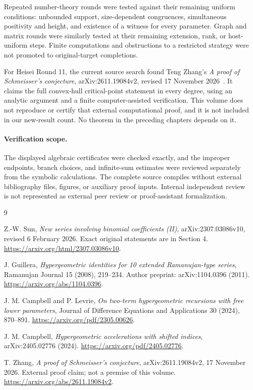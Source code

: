 \documentclass[11pt,a4paper]{article}
\theoremstyle{remark}\newtheorem{remark}[theorem]{Remark}
\numberwithin{equation}{section}
\begin{document}
Repeated number-theory rounds were tested against their remaining uniform
conditions: unbounded support, size-dependent congruences, simultaneous
positivity and height, and existence of a witness for every parameter.
Graph and matrix rounds were similarly tested at their remaining extension,
rank, or host-uniform steps. Finite computations and obstructions to a
restricted strategy were not promoted to original-target completions.

For Heisei Round 11, the current source search found Teng Zhang's
\emph{A proof of Schmeisser's conjecture}, arXiv:2611.19084v2, revised
17 November 2026~\cite{Zhang}. It claims the full convex-hull critical-point
statement in every degree, using an analytic argument and a finite
computer-assisted verification. This volume does not reproduce or certify
that external computational proof, and it is not included in our new-result
count. No theorem in the preceding chapters depends on it.

\paragraph{Verification scope.}
The displayed algebraic certificates were checked exactly, and the
improper endpoints, branch choices, and infinite-sum estimates were reviewed
separately from the symbolic calculations. The complete source compiles
without external bibliography files, figures, or auxiliary proof inputs.
Internal independent review is not represented as external peer review or
proof-assistant formalization.

\begin{thebibliography}{9}\raggedright
{}
Z.-W. Sun, \emph{New series involving binomial coefficients (II)},
arXiv:2307.03086v10, revised 6 February 2026.
Exact original statements are in Section 4.
\url{https://arxiv.org/html/2307.03086v10}.

J. Guillera, \emph{Hypergeometric identities for 10 extended
Ramanujan-type series}, Ramanujan Journal 15 (2008), 219--234.
Author preprint: arXiv:1104.0396 (2011).
\url{https://arxiv.org/abs/1104.0396}.

J. M. Campbell and P. Levrie,
\emph{On two-term hypergeometric recursions with free lower parameters},
Journal of Difference Equations and Applications 30 (2024), 870--891.
\url{https://arxiv.org/pdf/2305.00626}.

J. M. Campbell, \emph{Hypergeometric accelerations with shifted indices},
arXiv:2405.02776 (2024).
\url{https://arxiv.org/pdf/2405.02776}.

T. Zhang, \emph{A proof of Schmeisser's conjecture},
arXiv:2611.19084v2, 17 November 2026.
External proof claim; not a premise of this volume.
\url{https://arxiv.org/abs/2611.19084v2}.
\end{thebibliography}
\end{document}
